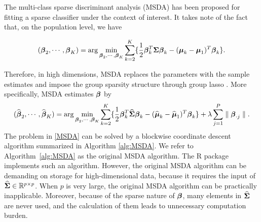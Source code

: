The multi-class sparse discriminant analysis (MSDA) has been proposed for fitting a sparse classifier under the context of interest. It takes note of the fact that, on the population level, we have

\begin{equation}
(\boldsymbol{\beta}_2,\cdots,\boldsymbol{\beta}_K)=\arg\min_{\boldsymbol{\beta}_2,\cdots,\boldsymbol{\beta}_K}\sum_{k=2}^K\{\frac{1}{2}\boldsymbol{\beta}_k^T\boldsymbol{\Sigma}\boldsymbol{\beta}_k-(\boldsymbol{\mu}_k-\boldsymbol{\mu}_1)^T\boldsymbol{\beta}_k\}.
\end{equation}

Therefore, in high dimensions, MSDA replaces the parameters with the sample estimates and impose the group sparsity structure through group lasso \citep{yuan2006model}. More specifically, MSDA estimates $\boldsymbol{\beta}$ by
\begin{equation}\label{MSDA}
(\widehat{\boldsymbol{\beta}}_2,\cdots,\widehat{\boldsymbol{\beta}}_K)=\arg\min_{\boldsymbol{\beta}_2,\cdots,\boldsymbol{\beta}_K}\sum_{k=2}^K\{\frac{1}{2}\boldsymbol{\beta}_k^T\widehat{\boldsymbol{\Sigma}}\boldsymbol{\beta}_k-(\widehat{\boldsymbol{\mu}}_k-\widehat{\boldsymbol{\mu}}_1)^T\boldsymbol{\beta}_k\}+\lambda\sum_{j=1}^P\parallel \boldsymbol{\beta}_{\cdot j}\parallel.
\end{equation}
The problem in \eqref{MSDA} can be solved by a blockwise coordinate descent algorithm \citep{MSDA} summarized in Algorithm \ref{alg:MSDA}. We refer to Algorithm~\ref{alg:MSDA} as the original MSDA algorithm. The R package  implements such an algorithm. However, the original MSDA algorithm can be demanding on storage for high-dimensional data, because it requires the input of $\widehat{\boldsymbol{\Sigma}}\in\mathbb{R}^{p\times p}$. When $p$ is very large, the original MSDA algorithm can be practically inapplicable. Moreover, because of the sparse nature of $\boldsymbol{\beta}$, many elements in $\widehat{\boldsymbol{\Sigma}}$ are never used, and the calculation of them leads to unnecessary computation burden.


